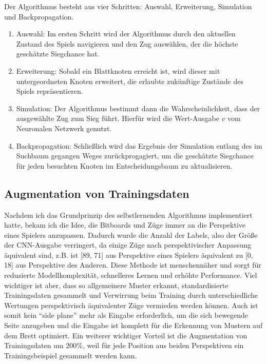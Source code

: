 \documentclass[
  manuscript=article,  %
  layout=publish,  %
  year=2023,
  volume=1,
]{extra/joas}
\begin{document}
Der Algorithmus besteht aus vier Schritten: Auswahl, Erweiterung, Simulation und Backpropagation.
\begin{enumerate}

\item Auswahl: Im ersten Schritt wird der Algorithmus durch den aktuellen Zustand des Spiels navigieren und den Zug auswählen, der die höchste geschätzte Siegchance hat.

\item Erweiterung: Sobald ein Blattknoten erreicht ist, wird dieser mit untergeordneten Knoten erweitert, die erlaubte zukünftige Zustände des Spiels repräsentieren.

\item Simulation: Der Algorithmus bestimmt dann die Wahrscheinlichkeit, dass der ausgewählte Zug zum Sieg führt. Hierfür wird die Wert-Ausgabe $v$ vom Neuronalen Netzwerk genutzt.

\item Backpropagation: Schließlich wird das Ergebnis der Simulation entlang des im Suchbaum gegangen Weges zurückprogagiert, um die geschätzte Siegchance für jeden besuchten Knoten im Entscheidungsbaum zu aktualisieren.
\end{enumerate}

\subsection{Augmentation von Trainingsdaten}
Nachdem ich das Grundprinzip des selbstlernenden Algorithmus  implementiert hatte, bekam ich die Idee, die Bitboards und Züge immer an die Perspektive eines  Spielers anzupassen.
Dadurch wurde die Anzahl der Labels, also der Größe der CNN-Ausgabe verringert, da einige Züge nach perspektivischer Anpassung äquivalent sind, z.B. ist [89, 71] aus Perspektive eines Spielers äquivalent zu [0, 18] aus Perspektive des Anderen. Diese Methode ist menschennäher und sorgt für reduzierte Modellkomplexität, schnelleres Lernen und erhöhte Performance. Viel wichtiger ist aber, dass so allgemeinere Muster erkannt, standardisierte Trainingsdaten gesammelt und Verwirrung beim Training durch unterschiedliche Wertungen perspektivisch äquivalenter Züge vermieden werden können. Auch ist somit kein “side plane” mehr als Eingabe erforderlich, um die sich bewegende Seite anzugeben und die Eingabe ist komplett für die Erkennung von Mustern auf dem Brett optimiert. Ein weiterer wichtiger Vorteil ist die Augmentation von Trainingsdaten um 200\%, weil für jede Position aus beiden Perspektiven ein Trainingsbeispiel gesammelt werden kann.
\end{document}
